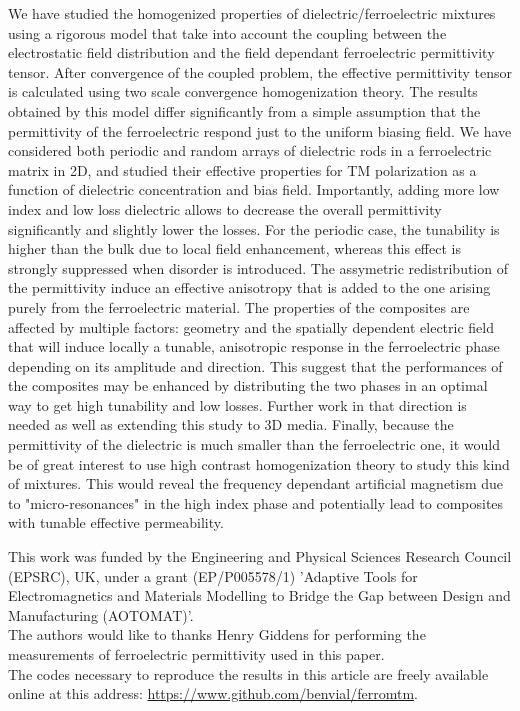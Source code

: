 \documentclass[%
 aip,
 amsmath,amssymb,
 reprint,%
]{revtex4-1}
\begin{document}
We have studied the homogenized properties of dielectric/ferroelectric mixtures
using a rigorous model that take into account the coupling between the electrostatic
field distribution and the field dependant ferroelectric permittivity tensor. After
convergence of the coupled problem, the effective permittivity tensor is calculated using
two scale convergence homogenization theory.
The results obtained by this model differ significantly from a simple assumption that
the permittivity of the ferroelectric respond just to the uniform biasing field.
We have considered both periodic and random arrays
of dielectric rods in a ferroelectric matrix in 2D, and studied their effective properties
for TM polarization as a function of dielectric concentration and bias field.
Importantly, adding more low index and low loss dielectric allows to decrease
the overall permittivity significantly and slightly lower the losses.
For the periodic case, the tunability is higher than the bulk due to local field enhancement, whereas
this effect is strongly suppressed when disorder is introduced. The assymetric redistribution of the permittivity
induce an effective anisotropy that is added to the one arising purely from the ferroelectric material.
The properties of the composites are affected by multiple factors:
geometry and the spatially dependent electric field that will induce locally a tunable, anisotropic
response in the ferroelectric phase depending on its amplitude and direction.
This suggest that the performances of the composites
may be enhanced by distributing the two phases in an optimal way to get high
tunability and low losses. Further work in that direction is needed as well as
extending this study to 3D media.
Finally, because the permittivity of the dielectric is much smaller than the ferroelectric one,
it would be of great interest to use high contrast homogenization theory
\cite{bouchitte_homogenization_2004, cherednichenko_homogenization_2015} to
study this kind of mixtures.
This would reveal the frequency dependant artificial magnetism due to "micro-resonances"
in the high index phase and potentially lead to composites with tunable effective permeability.



\begin{acknowledgments}
This work was funded by the Engineering and Physical Sciences Research
Council (EPSRC), UK, under a grant (EP/P005578/1) 'Adaptive Tools for
Electromagnetics and Materials Modelling to Bridge the Gap between
Design and Manufacturing (AOTOMAT)'.\\
The authors would like to thanks Henry Giddens for performing the
measurements of ferroelectric permittivity used in this paper.\\
%
The codes necessary to reproduce the results in this article are freely
available online at this address: \href{https://www.github.com/benvial/ferromtm}{https://www.github.com/benvial/ferromtm}.
\end{acknowledgments}
\end{document}
